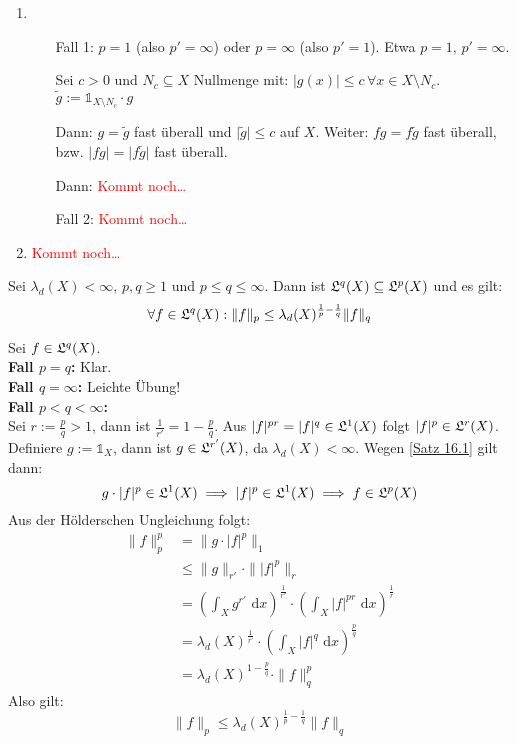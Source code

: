 \documentclass[a4paper,twoside,DIV15,BCOR12mm,chapterprefix=true,headings=onelinechapter]{scrbook}
\begin{document}
\begin{beweis}
\begin{enumerate}
\item
\begin{itemize}
\item[Fall 1:]  \(p=1\) (also \(p'=\infty\)) oder \(p=\infty\) (also \(p'=1\)). Etwa \(p=1,\,p'=\infty\).

Sei \(c>0\) und \(N_{c}\subseteq X\) Nullmenge mit: \(\lvert g(x)\rvert\leq c\,\forall x\in X\setminus N_{c}\). 
\(\tilde{g}:=\mathds{1}_{X\setminus N_{c}}\cdot g\)

Dann: \(g=\tilde{g}\) fast \"uberall und \(\lvert\tilde{g}\rvert\leq c\) auf \(X\). Weiter: \(fg=f\tilde{g}\) fast \"uberall,
bzw. \(\lvert fg\rvert=\lvert f\tilde{g}\rvert\) fast \"uberall.

Dann: \textcolor{red}{Kommt noch\ldots}
\item[Fall 2:]  \textcolor{red}{Kommt noch\ldots}
\end{itemize}
\item \textcolor{red}{Kommt noch\ldots}
\end{enumerate}
\end{beweis}

\begin{satz}
\label{Satz 16.2}
Sei $\lambda_d(X)<\infty$, $p,q\ge 1$ und $p\leq q \leq \infty$. Dann ist $\mathfrak{L}^q(X)\subseteq\mathfrak{L}^p(X)$ und es gilt:
\[\forall f\in\mathfrak{L}^q(X): \|f\|_p\le\lambda_d(X)^{\frac1p-\frac1q}\|f\|_q\]
\end{satz}

\begin{beweis}
Sei $f\in\mathfrak{L}^q(X)$.\\
\textbf{Fall $p=q$:} Klar.\\
\textbf{Fall $q=\infty$:} Leichte Übung!\\
\textbf{Fall $p<q<\infty$:}\\
Sei $r:=\frac pq>1$, dann ist $\frac 1{r'}=1-\frac pq$. Aus $|f|^{pr}=|f|^q\in\mathfrak{L}^1(X)$ folgt $|f|^p\in\mathfrak{L}^r(X)$. Definiere $g:=\mathds{1}_X$, dann ist $g\in\mathfrak{L}^{r'}(X)$, da $\lambda_d(X)<\infty$. Wegen \ref{Satz 16.1} gilt dann:
\[g\cdot|f|^p\in\mathfrak{L}^1(X)\implies |f|^p\in\mathfrak{L}^1(X)\implies f\in\mathfrak{L}^p(X)\]
Aus der Hölderschen Ungleichung folgt:
\begin{align*}
\|f\|^p_p&=\|g\cdot |f|^p\|_1\\
&\le \|g\|_{r'}\cdot\||f|^p\|_r\\
&= (\int_X g^{r'}\text{ d}x)^{\frac 1{r'}}\cdot(\int_X |f|^{pr}\text{ d}x)^{\frac 1r}\\
&= \lambda_d(X)^{\frac1{r'}}\cdot(\int_X |f|^{q}\text{ d}x)^{\frac pq}\\
&= \lambda_d(X)^{1-\frac pq}\cdot\|f\|^p_q
\end{align*}
Also gilt:
\[\|f\|_p\le\lambda_d(X)^{\frac1p-\frac1q}\|f\|_q\]
\end{beweis}
\end{document}
